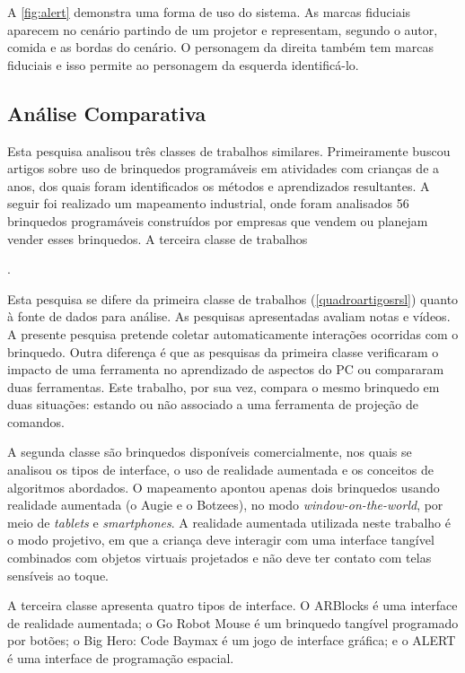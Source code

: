 A \autoref{fig:alert} demonstra uma forma de uso do sistema. As marcas fiduciais aparecem no cenário partindo de um projetor e representam, segundo o autor, comida e as bordas do cenário. O personagem da direita também tem marcas fiduciais e isso permite ao personagem da esquerda identificá-lo.

\subsection{Análise Comparativa}

Esta pesquisa analisou três classes de trabalhos similares. Primeiramente buscou artigos sobre uso de brinquedos programáveis em atividades com crianças de \idadeinicial a \idadefinal anos, dos quais foram identificados os métodos e aprendizados resultantes. A seguir foi realizado um mapeamento industrial, onde foram analisados 56 brinquedos programáveis construídos por empresas que vendem ou planejam vender esses brinquedos. A terceira classe de trabalhos

.

Esta pesquisa se difere da primeira classe de trabalhos (\autoref{quadroartigosrsl}) quanto à fonte de dados para análise. As pesquisas apresentadas avaliam notas e vídeos. A presente pesquisa pretende coletar automaticamente interações ocorridas com o brinquedo. Outra diferença é que as pesquisas da primeira classe verificaram o impacto de uma ferramenta no aprendizado de aspectos do PC ou compararam duas ferramentas. Este trabalho, por sua vez, compara o mesmo brinquedo em duas situações: estando ou não associado a uma ferramenta de projeção de comandos.

A segunda classe são brinquedos disponíveis comercialmente, nos quais se analisou os tipos de interface, o uso de realidade aumentada e os conceitos de algoritmos abordados. O mapeamento apontou apenas dois brinquedos usando realidade aumentada (o Augie e o Botzees), no modo \textit{window-on-the-world}, por meio de \textit{tablets} e \textit{smartphones}. A realidade aumentada utilizada neste trabalho é o modo projetivo, em que a criança deve interagir com uma interface tangível combinados com objetos virtuais projetados e não deve ter contato com telas sensíveis ao toque.

A terceira classe apresenta quatro tipos de interface. O ARBlocks é uma interface de realidade aumentada; o Go Robot Mouse é um brinquedo tangível programado por botões; o Big Hero: Code Baymax é um jogo de interface gráfica; e o ALERT é uma interface de programação espacial.

